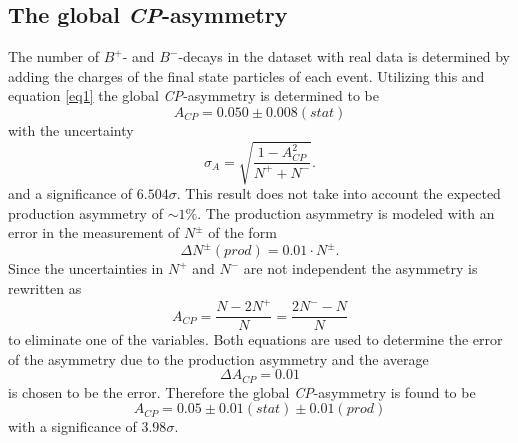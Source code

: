 \subsection{The global \textit{CP}-asymmetry}
The number of $B^+$- and $B^-$-decays in the dataset with real data is determined by adding the charges of the final state 
particles of each event. Utilizing this and equation \eqref{eq1} the global \textit{CP}-asymmetry is determined to be 
\begin{equation}
  A_\textit{CP} = 0.050 \pm 0.008 (stat)
\end{equation}
with the uncertainty 
\begin{equation}
  \sigma_A = \sqrt{\frac{1-A_\textit{CP}^2}{N^+ + N^-}}.
\end{equation}
and a significance of $6.504 \sigma$. This result does not take into account the expected production asymmetry of $\sim 1\%$. 
The production asymmetry is modeled with an error in the measurement of $N^\pm$ of the form 
\begin{equation}
  \Delta N^\pm (prod) = 0.01 \cdot N^\pm . 
\end{equation}
Since the uncertainties in $N^+$ and $N^-$ are not independent the asymmetry is rewritten as
\begin{equation}
  A_\textit{CP} = \frac{N- 2 N^+}{N} = \frac{2 N^- - N}{N}
\end{equation}
to eliminate one of the variables. Both equations are used to determine the error of the asymmetry due to the production 
asymmetry and the average 
\begin{equation}
  \Delta A_\textit{CP} = 0.01 
\end{equation}
is chosen to be the error.
Therefore the global \textit{CP}-asymmetry is found to be 
\begin{equation}
  A_\textit{CP} = 0.05 \pm 0.01 (stat) \pm 0.01 (prod)
\end{equation}
with a significance of $3.98\sigma$.




